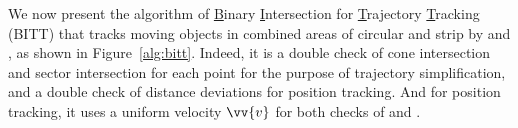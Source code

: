 We now present the algorithm of \underline{B}inary \underline{I}ntersection for \underline{T}rajectory \underline{T}racking (BITT) that tracks moving objects in combined areas of circular and strip by \sed and \ped, as shown in Figure~\ref{alg:bitt}. 
%
Indeed, it is a double check of cone intersection and sector intersection for each point for the purpose of trajectory simplification, and a double check of distance deviations for position tracking. And for position tracking, it uses a uniform velocity $\vv{v}$ for both checks of \sed and \ped. %

\begin{figure}[tb!]   
	\begin{center}
		{\small
			\begin{minipage}{3.3in}
				\myhrule
\end{minipage}}
\end{center}
\end{figure}
